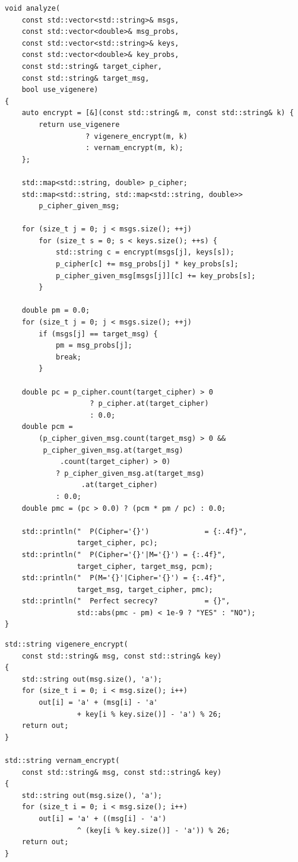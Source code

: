 \documentclass[14pt]{extarticle}
\begin{document}
\begin{listing}[htbp]
\caption{Функция анализа}
\begin{verbatim}
void analyze(
    const std::vector<std::string>& msgs,
    const std::vector<double>& msg_probs,
    const std::vector<std::string>& keys,
    const std::vector<double>& key_probs,
    const std::string& target_cipher,
    const std::string& target_msg,
    bool use_vigenere)
{
    auto encrypt = [&](const std::string& m, const std::string& k) {
        return use_vigenere
                   ? vigenere_encrypt(m, k)
                   : vernam_encrypt(m, k);
    };

    std::map<std::string, double> p_cipher;
    std::map<std::string, std::map<std::string, double>>
        p_cipher_given_msg;

    for (size_t j = 0; j < msgs.size(); ++j)
        for (size_t s = 0; s < keys.size(); ++s) {
            std::string c = encrypt(msgs[j], keys[s]);
            p_cipher[c] += msg_probs[j] * key_probs[s];
            p_cipher_given_msg[msgs[j]][c] += key_probs[s];
        }

    double pm = 0.0;
    for (size_t j = 0; j < msgs.size(); ++j)
        if (msgs[j] == target_msg) {
            pm = msg_probs[j];
            break;
        }

    double pc = p_cipher.count(target_cipher) > 0
                    ? p_cipher.at(target_cipher)
                    : 0.0;
    double pcm =
        (p_cipher_given_msg.count(target_msg) > 0 &&
         p_cipher_given_msg.at(target_msg)
             .count(target_cipher) > 0)
            ? p_cipher_given_msg.at(target_msg)
                  .at(target_cipher)
            : 0.0;
    double pmc = (pc > 0.0) ? (pcm * pm / pc) : 0.0;

    std::println("  P(Cipher='{}')             = {:.4f}",
                 target_cipher, pc);
    std::println("  P(Cipher='{}'|M='{}') = {:.4f}",
                 target_cipher, target_msg, pcm);
    std::println("  P(M='{}'|Cipher='{}') = {:.4f}",
                 target_msg, target_cipher, pmc);
    std::println("  Perfect secrecy?           = {}",
                 std::abs(pmc - pm) < 1e-9 ? "YES" : "NO");
}
\end{verbatim}
\end{listing}

\begin{listing}[htbp]
\caption{Функции шифрования Виженера и Вернама}
\begin{verbatim}
std::string vigenere_encrypt(
    const std::string& msg, const std::string& key)
{
    std::string out(msg.size(), 'a');
    for (size_t i = 0; i < msg.size(); i++)
        out[i] = 'a' + (msg[i] - 'a'
                 + key[i % key.size()] - 'a') % 26;
    return out;
}

std::string vernam_encrypt(
    const std::string& msg, const std::string& key)
{
    std::string out(msg.size(), 'a');
    for (size_t i = 0; i < msg.size(); i++)
        out[i] = 'a' + ((msg[i] - 'a')
                 ^ (key[i % key.size()] - 'a')) % 26;
    return out;
}
\end{verbatim}
\end{listing}
\end{document}
